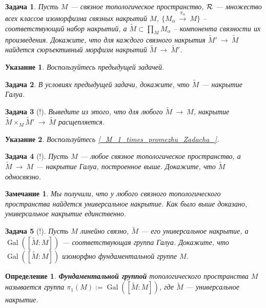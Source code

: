 \documentclass[12pt]{book}
\newcommand{\arrow}{{\:\longrightarrow\:}}
\newcommand{\Gal}{\operatorname{Gal}}
\theoremstyle{upshape}
\newtheorem{zadacha}{Задача}[chapter]
\theoremstyle{generic}
\newtheorem{opredelenie}[teorema]{Определение}
\theoremstyle{upshapenonumber}
\newtheorem{ukazanie}{Указание}[section]
\newtheorem{zamechanie}{Замечание}[chapter]
\newcommand{\следствие}{%
     \refstepcounter{teorema}
     {\noindent\bf Следствие \thechapter.\arabic{teorema}:\ }}
\newcommand{\пример}{%
     \refstepcounter{teorema}
     {\noindent\bf Пример \thechapter.\arabic{teorema}:\ }}
\newcommand{\лемма}{%
     \refstepcounter{teorema}
     {\noindent\bf Лемма \thechapter.\arabic{teorema}:\ }}
\newcommand{\теорема}{%
     \refstepcounter{teorema}
     {\noindent\bf Теорема \thechapter.\arabic{teorema}:\ }}
\newcommand{\утверждение}{%
     \refstepcounter{teorema}
     {\noindent\bf Утверждение \thechapter.\arabic{teorema}:\ }}
\begin{document}
{\begin{zadacha}  
Пусть $M$ --- связное топологическое пространство, 
${\cal R}$ --- множество всех классов изоморфизма связных
накрытий $M$, $\{M_\alpha\stackrel{\pi_\alpha}\arrow M\}$ --
соответствующий набор накрытий, а 
$\tilde M\subset \prod_M M_{\alpha}$ --
компонента связности их произведения.
Докажите, что для каждого связного 
накрытия $\tilde M' \arrow \tilde M$
найдется сюръективный морфизм накрытий
$\tilde M \arrow \tilde M'$. 
\end{zadacha}

\begin{ukazanie} Воспользуйтесь предыдущей задачей.
\end{ukazanie}

\begin{zadacha}
В условиях предыдущей задачи,
докажите, что $\tilde M$ --- накрытие Галуа.
\end{zadacha}

\begin{zadacha}[!]
Выведите из этого, что для любого $\tilde M \arrow M$, накрытие
$\tilde M \times_M \tilde M'\arrow \tilde M$ расщепляется.
\end{zadacha}

\begin{ukazanie} Воспользуйтесь
\ref{_M_1_times_promezhu_Zadacha_}.
\end{ukazanie}

\begin{zadacha}[!]
Пусть $M$ --- любое связное
топологическое пространство, а 
$\tilde M \arrow M$ --- накрытие Галуа, построенное выше.
Докажите, что $\tilde M$ односвязно.
\end{zadacha}

\begin{zamechanie}
Мы получили, что у любого связного
топологического пространства найдется
универсальное накрытие. Как было выше
доказано, универсальное накрытие единственно.
\end{zamechanie}

\begin{zadacha}[!]
Пусть $M$ линейно связно, $\tilde M$ --- его универсальное
накрытие, а $\Gal([\tilde M:M])$ --- соответствующая группа
Галуа. Докажите, что $\Gal([\tilde M:M])$ изоморфно
фундаментальной группе $M$.
\end{zadacha}

\begin{opredelenie}
{\bf Фундаментальной группой} топологического
пространства $M$ называется группа $\pi_1(M):=\Gal([\tilde M:M])$,
где $\tilde M$ --- универсальное накрытие.
\end{opredelenie}

}
\end{document}
